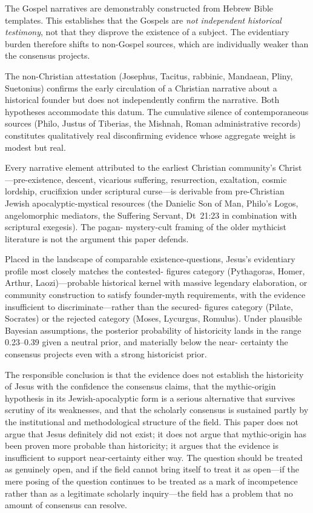\documentclass[12pt,oneside]{article}
\begin{document}
The Gospel narratives are demonstrably constructed from Hebrew
Bible templates.  This establishes that the Gospels are \textit{not
independent historical testimony}, not that they disprove the
existence of a subject.  The evidentiary burden therefore shifts
to non-Gospel sources, which are individually weaker than the
consensus projects.

The non-Christian attestation (Josephus, Tacitus, rabbinic,
Mandaean, Pliny, Suetonius) confirms the early circulation of a
Christian narrative about a historical founder but does not
independently confirm the narrative.  Both hypotheses accommodate
this datum.  The cumulative silence of contemporaneous sources
(Philo, Justus of Tiberias, the Mishnah, Roman administrative
records) constitutes qualitatively real disconfirming evidence
whose aggregate weight is modest but real.

Every narrative element attributed to the earliest Christian
community's Christ---pre-existence, descent, vicarious suffering,
resurrection, exaltation, cosmic lordship, crucifixion under
scriptural curse---is derivable from pre-Christian Jewish
apocalyptic-mystical resources (the Danielic Son of Man, Philo's
Logos, angelomorphic mediators, the Suffering Servant,
Dt~21:23 in combination with scriptural exegesis).  The pagan-
mystery-cult framing of the older mythicist literature is not the
argument this paper defends.

Placed in the landscape of comparable existence-questions,
Jesus's evidentiary profile most closely matches the contested-
figures category (Pythagoras, Homer, Arthur, Laozi)---probable
historical kernel with massive legendary elaboration, or community
construction to satisfy founder-myth requirements, with the
evidence insufficient to discriminate---rather than the secured-
figures category (Pilate, Socrates) or the rejected category
(Moses, Lycurgus, Romulus).  Under plausible Bayesian assumptions,
the posterior probability of historicity lands in the range
0.23--0.39 given a neutral prior, and materially below the near-
certainty the consensus projects even with a strong historicist
prior.

The responsible conclusion is that the evidence does not establish
the historicity of Jesus with the confidence the consensus claims,
that the mythic-origin hypothesis in its Jewish-apocalyptic form
is a serious alternative that survives scrutiny of its weaknesses,
and that the scholarly consensus is sustained partly by the
institutional and methodological structure of the field.  This
paper does not argue that Jesus definitely did not exist; it does
not argue that mythic-origin has been proven more probable than
historicity; it argues that the evidence is insufficient to
support near-certainty either way.  The question should be treated
as genuinely open, and if the field cannot bring itself to treat
it as open---if the mere posing of the question continues to be
treated as a mark of incompetence rather than as a legitimate
scholarly inquiry---the field has a problem that no amount of
consensus can resolve.
\end{document}
